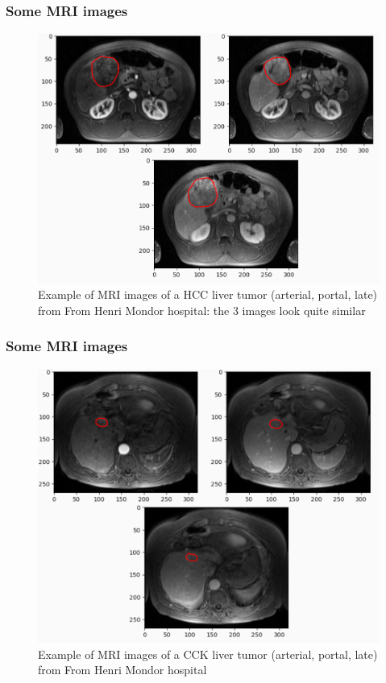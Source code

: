 \documentclass{beamer}
\begin{document}
\begin{frame}
    \frametitle{Some MRI images}
    \begin{figure}
        \centering
        \includegraphics[scale = 0.215]{images/HCC.png}
        \caption{Example of MRI images of a HCC liver tumor (arterial, portal, late) from From Henri Mondor hospital: the 3 images look quite similar}
    \end{figure}
\end{frame}

\begin{frame}
    \frametitle{Some MRI images}
    \begin{figure}
        \centering
        \includegraphics[scale = 0.215]{images/CCK.png}
        \caption{Example of MRI images of a CCK liver tumor (arterial, portal, late) from From Henri Mondor hospital}
    \end{figure}
\end{frame}
\end{document}
